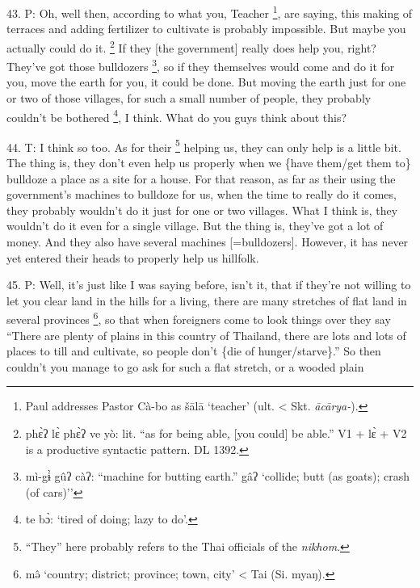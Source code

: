 43. P: Oh, well then, according to what you, Teacher \footnote{Paul addresses Pastor Cà-bo as šālā `teacher' (ult. < Skt. \textit{ācārya-}).}, are saying, this making
of terraces and adding fertilizer to cultivate is probably impossible. But maybe
you actually could do it. \footnote{phɛ̀ʔ lɛ̀ phɛ̀ʔ ve yò: lit. ``as for being able, [you could] be able.'' V1 + lɛ̀ + V2 is a productive syntactic pattern. DL 1392.} If they [the government] really does help you, right?
They've got those bulldozers \footnote{mì-gɨ̀ gûʔ càʔ: ``machine for butting earth.'' gâʔ `collide; butt (as goats); crash (of cars)''}, so if they themselves would come and do it for
you, move the earth for you, it could be done. But moving the earth just for one
or two of those villages, for such a small number of people, they probably couldn't
be bothered \footnote{te bɔ̀: `tired of doing; lazy to do'.}, I think. What do you guys think about this?

44. T: I think so too. As for their \footnote{``They'' here probably refers to the Thai officials of the \textit{nikhom}.} helping us, they can only help is a little
bit. The thing is, they don't even help us properly when we \{have them/get them
to\} bulldoze a place as a site for a house. For that reason, as far as their using
the government's machines to bulldoze for us, when the time to really do it comes,
they probably wouldn't do it just for one or two villages. What I think is, they
wouldn't do it even for a single village. But the thing is, they've got a lot of
money. And they also have several machines [=bulldozers]. However, it has never
yet entered their heads to properly help us hillfolk.

45. P: Well, it's just like I was saying before, isn't it, that if they're not
willing to let you clear land in the hills for a living, there are many stretches
of flat land in several provinces \footnote{mə̂ `country; district; province; town, city' < Tai (Si. myaŋ).}, so that when foreigners come to look things
over they say ``There are plenty of plains in this country of Thailand, there are
lots and lots of places to till and cultivate, so people don't \{die of hunger/starve\}.''
So then couldn't you manage to go ask for such a flat stretch, or a wooded plain
